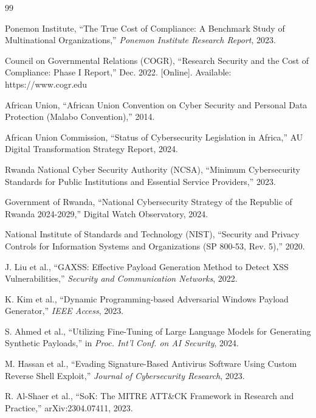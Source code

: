 \documentclass[11pt,conference]{IEEEtran}
\begin{document}

\begin{thebibliography}{99}

Ponemon Institute, ``The True Cost of Compliance: A Benchmark Study of Multinational Organizations,'' \textit{Ponemon Institute Research Report}, 2023.

Council on Governmental Relations (COGR), ``Research Security and the Cost of Compliance: Phase I Report,'' Dec. 2022. [Online]. Available: https://www.cogr.edu

African Union, ``African Union Convention on Cyber Security and Personal Data Protection (Malabo Convention),'' 2014.

African Union Commission, ``Status of Cybersecurity Legislation in Africa,'' AU Digital Transformation Strategy Report, 2024.

Rwanda National Cyber Security Authority (NCSA), ``Minimum Cybersecurity Standards for Public Institutions and Essential Service Providers,'' 2023.

Government of Rwanda, ``National Cybersecurity Strategy of the Republic of Rwanda 2024-2029,'' Digital Watch Observatory, 2024.

National Institute of Standards and Technology (NIST), ``Security and Privacy Controls for Information Systems and Organizations (SP 800-53, Rev. 5),'' 2020.

J. Liu et al., ``GAXSS: Effective Payload Generation Method to Detect XSS Vulnerabilities,'' \textit{Security and Communication Networks}, 2022.

K. Kim et al., ``Dynamic Programming-based Adversarial Windows Payload Generator,'' \textit{IEEE Access}, 2023.

S. Ahmed et al., ``Utilizing Fine-Tuning of Large Language Models for Generating Synthetic Payloads,'' in \textit{Proc. Int'l Conf. on AI Security}, 2024.

M. Hassan et al., ``Evading Signature-Based Antivirus Software Using Custom Reverse Shell Exploit,'' \textit{Journal of Cybersecurity Research}, 2023.

R. Al-Shaer et al., ``SoK: The MITRE ATT\&CK Framework in Research and Practice,'' arXiv:2304.07411, 2023.


\end{thebibliography}
\end{document}
